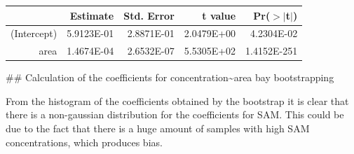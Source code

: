 \documentclass[]{tufte-handout}
\begin{document}
\begin{table}[ht]
\centering
\begin{tabular}{rrrrr}
  \toprule
 & Estimate & Std. Error & t value & Pr($>$$|$t$|$) \\ 
  \midrule
(Intercept) & 5.9123E-01 & 2.8871E-01 & 2.0479E+00 & 4.2304E-02 \\ 
  area & 1.4674E-04 & 2.6532E-07 & 5.5305E+02 & 1.4152E-251 \\ 
   \bottomrule
\end{tabular}
\end{table}

\newpage
\#\# Calculation of the coefficients for
concentration\textasciitilde{}area bay bootstrapping

From the histogram of the coefficients obtained by the bootstrap it is
clear that there is a non-gaussian distribution for the coefficients for
SAM. This could be due to the fact that there is a huge amount of
samples with high SAM concentrations, which produces bias.
\end{document}
